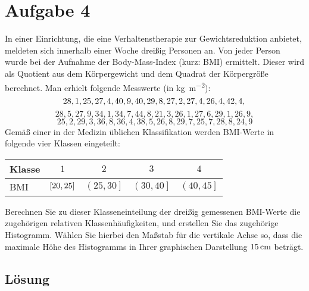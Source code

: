 \documentclass{exercise}
\begin{document}
    \section*{Aufgabe 4}

    \begin{problem}
        In einer Einrichtung, die eine Verhaltenstherapie zur Gewichtsreduktion anbietet, meldeten sich innerhalb einer Woche dreißig Personen an.
        Von jeder Person wurde bei der Aufnahme der Body-Mass-Index (kurz: BMI) ermittelt.
        Dieser wird als Quotient aus dem Körpergewicht und dem Quadrat der Körpergröße berechnet.
        Man erhielt folgende Messwerte (in \si{\kilo\gram\per\meter\squared}):
        \[
            28,1, 25, 27,4, 40,9, 40, 29,8, 27,2, 27,4, 26,4, 42,4,\\
        \]
        \[
            28,5, 27,9, 34,1, 34,7, 44,8, 21,3, 26,1, 27,6, 29,1, 26,9,
        \]
        \[
            25,2, 29,3, 36,8, 36,4, 38,5, 26,8, 29,7, 25,7, 28,8, 24,9
        \]
        Gemäß einer in der Medizin üblichen Klassifikation werden BMI-Werte in folgende vier Klassen eingeteilt:
        \begin{center}
            \begin{tabular}{lcccc}
                \toprule
                Klasse & \(1\) & \(2\) & \(3\) & \(4\)\\
                \midrule
                BMI & \(\brackets*{20, 25}\) & \(\left(25, 30\right]\) & \(\left(30, 40\right]\) & \(\left(40, 45\right]\)\\
                \bottomrule
            \end{tabular}
        \end{center}
        Berechnen Sie zu dieser Klasseneinteilung der dreißig gemessenen BMI-Werte die zugehörigen relativen Klassenhäufigkeiten, und erstellen Sie das zugehörige Histogramm.
        Wählen Sie hierbei den Maßstab für die vertikale Achse so, dass die maximale Höhe des Histogramms in Ihrer graphischen Darstellung \(15\sis{\centi\meter}\) beträgt.
    \end{problem}

    \subsection*{Lösung}
\end{document}
